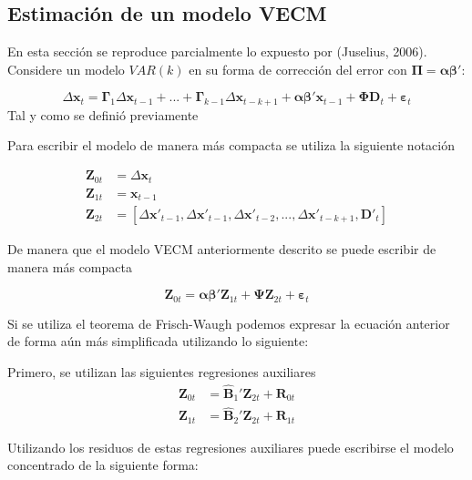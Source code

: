 \documentclass[12pt, twoside]{book}\usepackage[]{graphicx}\usepackage[]{color}
\numberwithin{equation}{section}
\numberwithin{theorem}{section}
\numberwithin{teorema}{section}
\numberwithin{defi}{section}
\numberwithin{prop}{section}
\numberwithin{defi}{section}
\theoremstyle{plain}
\begin{document}
\subsection{Estimación de un modelo VECM}
 
En esta sección se reproduce parcialmente lo expuesto por (Juselius, 2006). Considere un modelo $VAR(k)$ en su forma de corrección del error con $\boldsymbol{\Pi}=\boldsymbol{\alpha\beta'}$: 

\begin{equation}
\Delta \mathbf{x}_{t} = \boldsymbol{\Gamma}_{1}\Delta \mathbf{x}_{t-1}+... %
                        +\boldsymbol{\Gamma}_{k-1}\Delta \mathbf{x}_{t-k+1}+%
                        \boldsymbol{\alpha\beta'}\mathbf{x}_{t-1}+\boldsymbol{\Phi}\mathbf{D}_{t}+%
                        \boldsymbol{\varepsilon}_{t}
\end{equation}
Tal y como se definió previamente 

Para escribir el modelo de manera más compacta se utiliza la siguiente notación

\begin{align*}
\mathbf{Z}_{0t} & = \Delta \mathbf{x}_{t} \\
\mathbf{Z}_{1t} & =  \mathbf{x}_{t-1} \\
\mathbf{Z}_{2t} & = [\Delta \mathbf{x}'_{t-1},\Delta \mathbf{x}'_{t-1},\Delta \mathbf{x}'_{t-2},...,%
                     \Delta \mathbf{x}'_{t-k+1},\mathbf{D}'_{t}]
\end{align*}

De manera que el modelo VECM anteriormente descrito se puede escribir de manera más compacta 

\begin{equation}
\mathbf{Z}_{0t} = \boldsymbol{\alpha\beta'}\mathbf{Z}_{1t}+\boldsymbol{\Psi}\mathbf{Z}_{2t}+%
                    \boldsymbol{\varepsilon}_{t}
\end{equation}

Si se utiliza el teorema de Frisch-Waugh podemos expresar la ecuación anterior de forma aún más simplificada utilizando lo siguiente: 

Primero, se utilizan las siguientes regresiones auxiliares
\begin{align}
\mathbf{Z}_{0t} & = \mathbf{\hat{B}}_{1}'\mathbf{Z}_{2t}+\mathbf{R}_{0t} \\
\mathbf{Z}_{1t} & = \mathbf{\hat{B}}_{2}'\mathbf{Z}_{2t}+\mathbf{R}_{1t}
\end{align}

Utilizando los residuos de estas regresiones auxiliares puede escribirse el modelo concentrado de la siguiente forma: 
\end{document}
